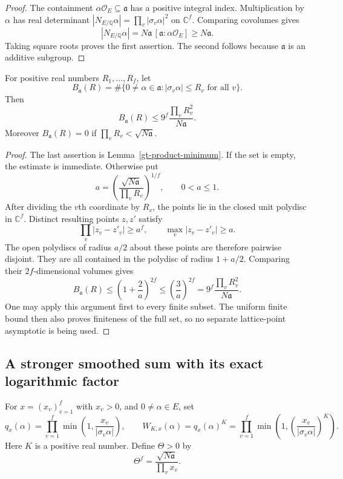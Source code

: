 \begin{proof}
The containment $\alpha\mathcal O_E\subseteq\mathfrak a$ has a
positive integral index.  Multiplication by $\alpha$ has real
determinant
$|N_{E/\mathbb Q}\alpha|=\prod_v|\sigma_v\alpha|^2$ on
$\mathbb C^f$.  Comparing covolumes gives
\[
 |N_{E/\mathbb Q}\alpha|
   =N\mathfrak a\,[\mathfrak a:\alpha\mathcal O_E]
   \geq N\mathfrak a.
\]
Taking square roots proves the first assertion.  The second follows
because $\mathfrak a$ is an additive subgroup.
\end{proof}

\begin{lemma}\label{gt-box-count}
For positive real numbers $R_1,\ldots,R_f$, let
\[
 B_{\mathfrak a}(R)=
 \#\{0\ne\alpha\in\mathfrak a:
                  |\sigma_v\alpha|\leq R_v\text{ for all }v\}.
\]
Then
\begin{equation}\label{gt-box-count-eq}
 B_{\mathfrak a}(R)
       \leq9^f\frac{\prod_vR_v^2}{N\mathfrak a}.
\end{equation}
Moreover $B_{\mathfrak a}(R)=0$ if
$\prod_vR_v<\sqrt{N\mathfrak a}$.
\end{lemma}

\begin{proof}
The last assertion is Lemma~\ref{gt-product-minimum}.
If the set is empty, the estimate is immediate.  Otherwise put
\[
 a=\left(\frac{\sqrt{N\mathfrak a}}{\prod_vR_v}\right)^{1/f},
 \qquad 0<a\leq1.
\]
After dividing the $v$th coordinate by $R_v$, the points lie in the
closed unit polydisc in $\mathbb C^f$.  Distinct resulting points
$z,z'$ satisfy
\[
 \prod_v|z_v-z'_v|\geq a^f,
 \qquad \max_v|z_v-z'_v|\geq a.
\]
The open polydiscs of radius $a/2$ about these points are therefore
pairwise disjoint.  They are all contained in the polydisc of radius
$1+a/2$.  Comparing their $2f$-dimensional volumes gives
\[
 B_{\mathfrak a}(R)
 \leq\left(1+\frac2a\right)^{2f}
 \leq\left(\frac3a\right)^{2f}
 =9^f\frac{\prod_vR_v^2}{N\mathfrak a}.
\]
One may apply this argument first to every finite subset.  The
uniform finite bound then also proves finiteness of the full set,
so no separate lattice-point asymptotic is being used.
\end{proof}

\subsection{A stronger smoothed sum with its exact logarithmic factor}

For $x=(x_v)_{v=1}^f$ with $x_v>0$, and $0\ne\alpha\in E$, set
\[
 q_x(\alpha)=\prod_{v=1}^f
       \min\left(1,\frac{x_v}{|\sigma_v\alpha|}\right),
 \qquad
 W_{K,x}(\alpha)=q_x(\alpha)^K
 =\prod_{v=1}^f
       \min\left(1,\left(\frac{x_v}{|\sigma_v\alpha|}\right)^K\right).
\]
Here $K$ is a positive real number.  Define $\Theta>0$ by
\begin{equation}\label{gt-theta}
 \Theta^f=\frac{\sqrt{N\mathfrak a}}{\prod_vx_v}.
\end{equation}

